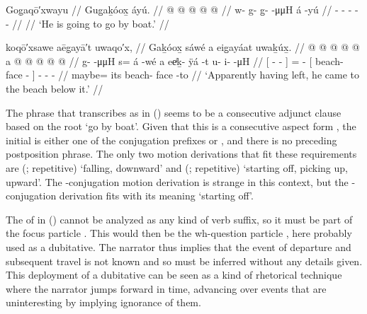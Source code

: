 \ex\label{ex:91-248-going-to-go-by-boat}%
%
\begingl
	\glpreamble	Gog̣aqō′xwayu //
	\glpreamble	Gug̱aḵóox̱ áyú. //
	\gla	{} @ {} @ {} @ {} @ {}  @ {}  //
	\glb	w- g- g̱-  -μμH á -yú //
	\glc	{}- - -  -  - //
	\gld	{} {} {} {} {}  {} //
	\glft	‘He is going to go by boat.’
		//
\endgl
\xe

\ex\label{ex:91-249-having-left-came-to-beach}%
%
\begingl
	\glpreamble	koqō′xsawe aēg̣ayā′t uwaqo′x, //
	\glpreamble	Gaḵóox̱ sáwé a eig̱ayáat uwaḵúx̱. //
	\gla	{}  @ {} @ {} @ {} {} 
		 @ {} @ {}
		{} a  @ {} @ {} {}
		 @ {} @ {} @ {} //
	\glb	{} g-  -μμH {} {}
		s= á -wé
		{} a eeͥḵ- ÿá -t {}
		u- i-  -μH //
	\glc	{}[ -  - \· {}]
		=  -
		{}[  beach- face - {}]
		- -  - //
	\gld	{}  {} {} {} {}
		maybe=  {}
		{} its beach- face -to {}
		 {} {} {} //
	\glft	‘Apparently having left, he came to the beach below it.’
		//
\endgl
\xe

The phrase that \citeauthor{swanton:1909} transcribes as  in (\lastx) seems to be a consecutive adjunct clause based on the root  ‘go by boat’.
Given that this is a consecutive aspect form , the initial  is either one of the conjugation prefixes  or , and there is no preceding postposition phrase.
The only two motion derivations that fit these requirements are (;  repetitive) ‘falling, downward’ and (;  repetitive) ‘starting off, picking up, upward’.
The -conjugation motion derivation is strange in this context, but the -conjugation derivation fits with its meaning ‘starting off’.

The  of  in (\lastx) cannot be analyzed as any kind of verb suffix, so it must be part of the focus particle .
This  would then be the wh-question particle , here probably used as a dubitative.
The narrator thus implies that the event of departure and subsequent travel is not known and so must be inferred without any details given.
This deployment of a dubitative can be seen as a kind of rhetorical technique where the narrator jumps forward in time, advancing over events that are uninteresting by implying ignorance of them.

